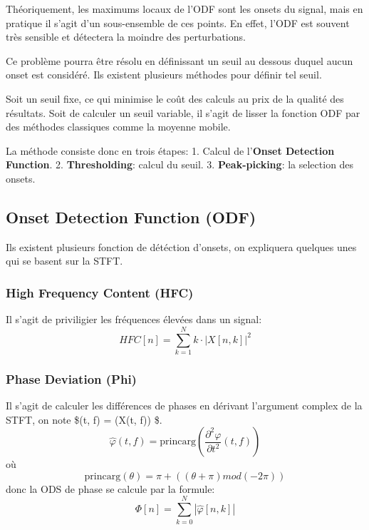 \documentclass[]{article}
\begin{document}
Théoriquement, les maximums locaux de l'ODF sont les onsets du signal,
mais en pratique il s'agit d'un sous-ensemble de ces points. En effet,
l'ODF est souvent très sensible et détectera la moindre des
perturbations.

Ce problème pourra être résolu en définissant un seuil au dessous duquel
aucun onset est considéré. Ils existent plusieurs méthodes pour définir
tel seuil.

Soit un seuil fixe, ce qui minimise le coût des calculs au prix de la
qualité des résultats. Soit de calculer un seuil variable, il s'agit de
lisser la fonction ODF par des méthodes classiques comme la moyenne
mobile.

La méthode consiste donc en trois étapes: 1. Calcul de l'\textbf{Onset
Detection Function}. 2. \textbf{Thresholding}: calcul du seuil. 3.
\textbf{Peak-picking}: la selection des onsets.

\hypertarget{onset-detection-function-odf}{%
\subsection{Onset Detection Function
(ODF)}\label{onset-detection-function-odf}}

Ils existent plusieurs fonction de détéction d'onsets, on expliquera
quelques unes qui se basent sur la STFT.

\hypertarget{high-frequency-content-hfc}{%
\subsubsection{High Frequency Content
(HFC)}\label{high-frequency-content-hfc}}

Il s'agit de priviligier les fréquences élevées dans un signal:
\[ HFC[n] = \sum\limits_{k=1}^{N}k\cdot\left\lvert X[n,k]\right\rvert^2 \]

\hypertarget{phase-deviation-phi}{%
\subsubsection{Phase Deviation (Phi)}\label{phase-deviation-phi}}

Il s'agit de calculer les différences de phases en dérivant l'argument
complex de la STFT, on note \$\varphi(t, f) = (X(t, f)) \$.
\[\hat{\varphi}(t, f) = \mathrm{princarg}
\left( \frac{\partial^2 \varphi}{\partial t^2}(t, f)  \right) \] où
\[ \mathrm{princarg}(\theta) = \pi + ((\theta + \pi) mod (-2\pi)) \]
donc la ODS de phase se calcule par la formule:
\[ \Phi[n] = \sum\limits_{k=0}^{N}\left\lvert \hat{\varphi}[n, k] \right\rvert \]
\end{document}
